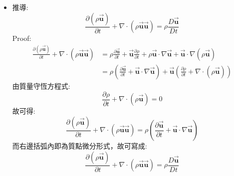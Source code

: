 \documentclass[../main.tex]{subfiles}
\begin{document}
\begin{itemize}
\begin{equation}
      \frac{df}{dt}=\frac{\partial f}{\partial t}+ \vec{v}\cdot \nabla f
    \end{equation}
    而當時，$\vec {\bm w} = \vec 0$，則會變為偏微分的形式
    \begin{equation}
      \boxed{\frac{Df}{Dt} = \frac{\partial f}{\partial t}} 
    \end{equation}
  \item 推導:
    \begin{equation}
      \frac{\partial (\rho \vec {\bm u})}{\partial t} + \nabla \cdot (\rho \vec {\bm u} \vec {\bm u}) = \rho \frac{D\vec {\bm u}}{Dt}  \label{eq:material_derivative_relation}
    \end{equation}
    Proof:
    \begin{align}
      \frac{\partial (\rho \vec {\bm u})}{\partial t} + \nabla \cdot (\boxed{\rho \vec {\bm u}} \boxed{\vec {\bm u}}) &= 
      \rho\frac{\partial \vec {\bm u}}{\partial t} + \vec {\bm u} \frac{\partial \rho}{\partial t} 
      + \rho \vec {\bm u} \cdot \nabla \vec {\bm u} + \vec {\bm u} \cdot \nabla (\rho \vec {\bm u}) \nonumber\\
      &= \rho\left(
        \frac{\partial \vec {\bm u}}{\partial t} + \vec {\bm u} \cdot \nabla \vec {\bm u}
      \right) + \vec {\bm u} \left(
        \frac{\partial \rho}{\partial t} + \nabla \cdot (\rho \vec {\bm u})
      \right)
    \end{align}  
    由質量守恆方程式:
    \begin{equation}
      \frac{\partial \rho}{\partial t} + \nabla \cdot (\rho \vec {\bm u}) = 0
    \end{equation}
    故可得:
    \begin{equation}
      \frac{\partial (\rho \vec {\bm u})}{\partial t} + \nabla \cdot (\rho \vec {\bm u} \vec {\bm u}) = \rho \left(
        \frac{\partial \vec {\bm u}}{\partial t} + \vec {\bm u} \cdot \nabla \vec {\bm u}
      \right)
    \end{equation}
    而右邊括弧內即為質點微分形式，故可寫成:
    \begin{equation}
      \frac{\partial (\rho \vec {\bm u})}{\partial t} + \nabla \cdot (\rho \vec {\bm u} \vec {\bm u}) = \rho \frac{D\vec {\bm u}}{Dt} 
    \end{equation}
\end{itemize}
\end{document}
